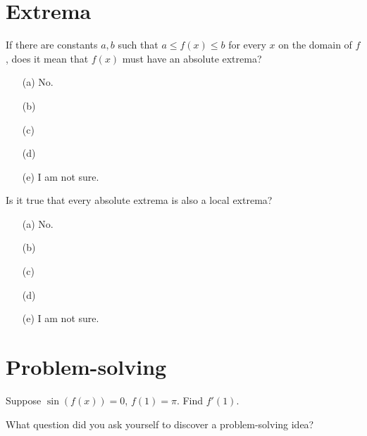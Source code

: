 \documentclass[14pt]{beamer}
\begin{document}
\section{Extrema}

\begin{frame}[t]
  If there are constants \(a,b\) such that \(a \le f(x) \le b\) for every \(x\) on the domain of \(f\), does it mean that \(f(x)\) must have an absolute extrema?

  \medskip
  \begin{itemize} \setlength\itemsep{2ex}
    \item[(a)] No.
    \item[(b)]  
    \item[(c)] 
    \item[(d)] 
    \item[(e)] I am not sure.
  \end{itemize} 
\end{frame}


\begin{frame}[t]
  Is it true that every absolute extrema is also a local extrema?

  \medskip
  \begin{itemize} \setlength\itemsep{2ex}
    \item[(a)] No.
    \item[(b)]  
    \item[(c)] 
    \item[(d)] 
    \item[(e)] I am not sure.
  \end{itemize} 
\end{frame}


\section{Problem-solving}
\begin{frame}[t]
  Suppose \(\sin(f(x)) = 0\), \(f(1) = \pi\). Find \(f'(1)\).

  What question did you ask yourself to discover a problem-solving idea?
\end{frame}
\end{document}
